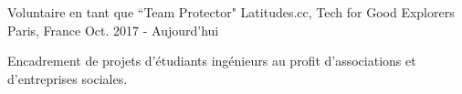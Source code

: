 \begin{cventries}
  \cventry
    {Voluntaire en tant que ``Team Protector"}
    {Latitudes.cc, Tech for Good Explorers}
    {Paris, France}
    {Oct. 2017 - Aujourd'hui}
    {
      \begin{cvitems}
        \item {Encadrement de projets d'étudiants ingénieurs au profit d'associations et d'entreprises sociales.}
      \end{cvitems}
    }
\end{cventries}
